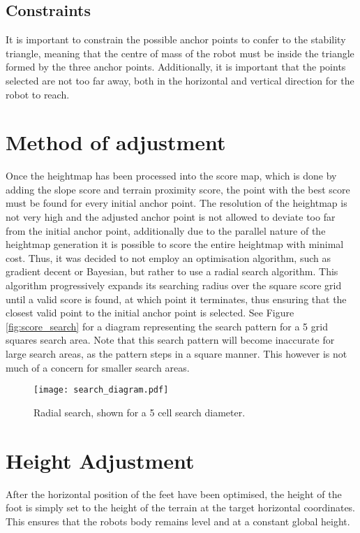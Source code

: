     \subsection{Constraints}
    It is important to constrain the possible anchor points to confer to the stability triangle,
    meaning that the centre of mass of the robot must be inside the triangle formed by the three
    anchor points. Additionally, it is important that the points selected are not too far away,
    both in the horizontal and vertical direction for the robot to reach.


\section{Method of adjustment}
    Once the heightmap has been processed into the score map, which is done by adding the
    slope score and terrain proximity score, the point with the best score must be found for every
    initial anchor point.
    The resolution of the heightmap is not very high and the adjusted anchor point is not
    allowed to deviate too far from the initial anchor point, additionally due to the parallel nature
    of the heightmap generation it is possible to score the entire heightmap with minimal cost.
    Thus, it was decided to not employ an optimisation algorithm, such as gradient decent or
    Bayesian, but rather to use a radial search algorithm. This algorithm progressively expands
    its searching radius over the square score grid until a valid score is found, at which point it
    terminates, thus ensuring that the closest valid point to the initial anchor point is selected.
    See Figure \ref{fig:score_search} for a diagram representing the search pattern for a 5 grid squares search area.
    Note that this search pattern will become inaccurate for large search areas, as the pattern steps
    in a square manner. This however is not much of a concern for smaller search areas.

    \begin{figure}[h]
        \centering
        \texttt{[image: search\_diagram.pdf]}
        \caption{Radial search, shown for a 5 cell search diameter.}
        \label{fig:radial_search}
    \end{figure}

    \section{Height Adjustment}
    After the horizontal position of the feet have been optimised, the height of the foot is simply set to the height of the
    terrain at the target horizontal coordinates. This ensures that the robots body remains level and at a constant global height.

